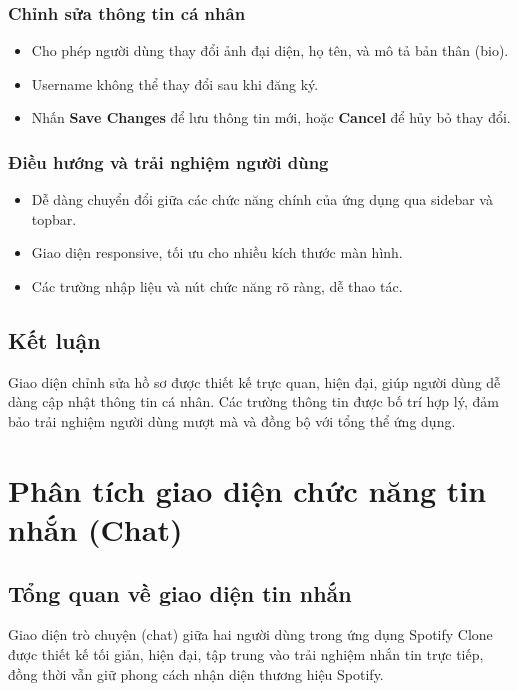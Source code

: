 \documentclass{book}
\let\oldsection\section
\renewcommand{\section}{\clearpage\oldsection}
\begin{document}
\subsubsection{Chỉnh sửa thông tin cá nhân}
\begin{itemize}
    \item Cho phép người dùng thay đổi ảnh đại diện, họ tên, và mô tả bản thân (bio).
    \item Username không thể thay đổi sau khi đăng ký.
    \item Nhấn \textbf{Save Changes} để lưu thông tin mới, hoặc \textbf{Cancel} để hủy bỏ thay đổi.
\end{itemize}

\subsubsection{Điều hướng và trải nghiệm người dùng}
\begin{itemize}
    \item Dễ dàng chuyển đổi giữa các chức năng chính của ứng dụng qua sidebar và topbar.
    \item Giao diện responsive, tối ưu cho nhiều kích thước màn hình.
    \item Các trường nhập liệu và nút chức năng rõ ràng, dễ thao tác.
\end{itemize}

\subsection{Kết luận}
Giao diện chỉnh sửa hồ sơ được thiết kế trực quan, hiện đại, giúp người dùng dễ dàng cập nhật thông tin cá nhân. Các trường thông tin được bố trí hợp lý, đảm bảo trải nghiệm người dùng mượt mà và đồng bộ với tổng thể ứng dụng.

\section{Phân tích giao diện chức năng tin nhắn (Chat)}

\subsection{Tổng quan về giao diện tin nhắn}
Giao diện trò chuyện (chat) giữa hai người dùng trong ứng dụng Spotify Clone được thiết kế tối giản, hiện đại, tập trung vào trải nghiệm nhắn tin trực tiếp, đồng thời vẫn giữ phong cách nhận diện thương hiệu Spotify.
\end{document}
